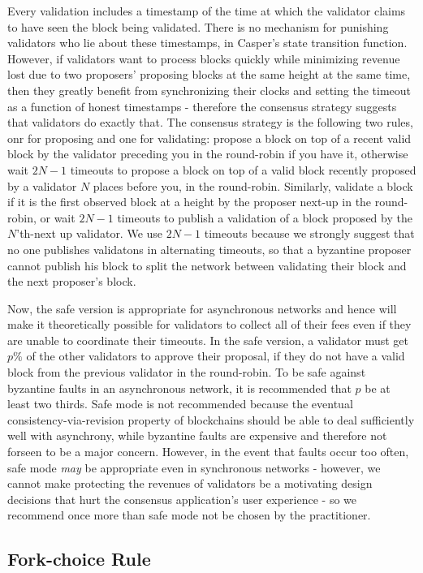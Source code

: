 \documentclass[11pt,a4paper]{article}
\begin{document}
Every validation includes a timestamp of the time at which the validator claims to have seen the block being validated. There is no mechanism for punishing validators who lie about these timestamps, in Casper's state transition function. However, if validators want to process blocks quickly while minimizing revenue lost due to two proposers' proposing blocks at the same height at the same time, then they greatly benefit from synchronizing their clocks and setting the timeout as a function of honest timestamps - therefore the consensus strategy suggests that validators do exactly that. The consensus strategy is the following two rules, onr for proposing and one for validating: propose a block on top of a recent valid block by the validator preceding you in the round-robin if you have it, otherwise wait $2N - 1$ timeouts to propose a block on top of a valid block recently proposed by a validator $N$ places before you, in the round-robin. Similarly, validate a block if it is the first observed block at a height by the proposer next-up in the round-robin, or wait $2N - 1$ timeouts to publish a validation of a block proposed by the $N$'th-next up validator. We use $2N - 1$ timeouts because we strongly suggest that no one publishes validatons in alternating timeouts, so that a byzantine proposer cannot publish his block to split the network between validating their block and the next proposer's block.

Now, the safe version is appropriate for asynchronous networks and hence will make it theoretically possible for validators to collect all of their fees even if they are unable to coordinate their timeouts. In the safe version, a validator must get $p\%$ of the other validators to approve their proposal, if they do not have a valid block from the previous validator in the round-robin. To be safe against byzantine faults in an asynchronous network, it is recommended that $p$ be at least two thirds. Safe mode is not recommended because the eventual consistency-via-revision property of blockchains should be able to deal sufficiently well with asynchrony, while byzantine faults are expensive and therefore not forseen to be a major concern. However, in the event that faults occur too often, safe mode \emph{may} be appropriate even in synchronous networks - however, we cannot make protecting the revenues of validators be a motivating design decisions that hurt the consensus application's user experience - so we recommend once more than safe mode not be chosen by the practitioner.

\subsection{Fork-choice Rule}
\end{document}
